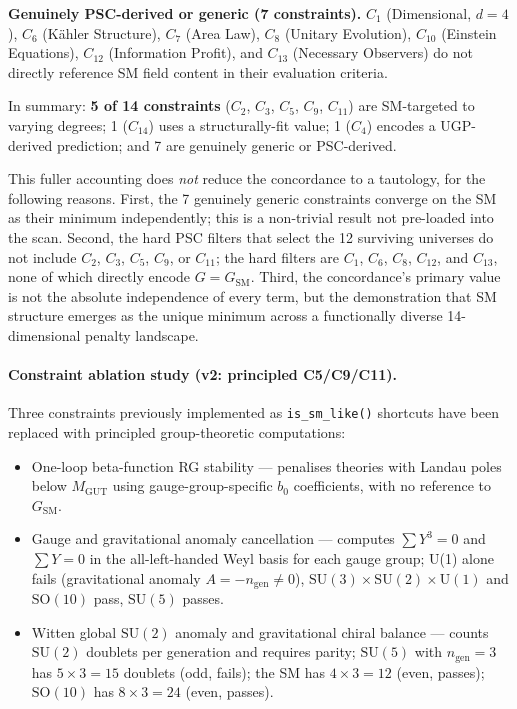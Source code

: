 \documentclass[11pt,twocolumn]{article}
\theoremstyle{remark}
\begin{document}
\textbf{Genuinely PSC-derived or generic (7 constraints).}
$C_1$ (Dimensional, $d=4$), $C_6$ (K\"{a}hler Structure), $C_7$ (Area
Law), $C_8$ (Unitary Evolution), $C_{10}$ (Einstein Equations), $C_{12}$
(Information Profit), and $C_{13}$ (Necessary Observers) do not
directly reference SM field content in their evaluation criteria.

In summary: \textbf{5 of 14 constraints} ($C_2$, $C_3$, $C_5$, $C_9$,
$C_{11}$) are SM-targeted to varying degrees; 1 ($C_{14}$) uses a
structurally-fit value; 1 ($C_4$) encodes a UGP-derived prediction; and
7 are genuinely generic or PSC-derived.

This fuller accounting does \emph{not} reduce the concordance to a
tautology, for the following reasons.
First, the 7 genuinely generic constraints converge on the SM as their
minimum independently; this is a non-trivial result not pre-loaded into
the scan.
Second, the hard PSC filters that select the 12 surviving universes
do not include $C_2$, $C_3$, $C_5$, $C_9$, or $C_{11}$; the
hard filters are $C_1$, $C_6$, $C_8$, $C_{12}$, and $C_{13}$,
none of which directly encode $G=G_{\mathrm{SM}}$.
Third, the concordance's primary value is not the absolute independence
of every term, but the demonstration that SM structure emerges as the
unique minimum across a functionally diverse 14-dimensional penalty
landscape.

\paragraph{Constraint ablation study (v2: principled C5/C9/C11).}
Three constraints previously implemented as \texttt{is\_sm\_like()} shortcuts
have been replaced with principled group-theoretic computations:
\begin{itemize}
  \item[$C_5$p:] One-loop beta-function RG stability — penalises theories with
    Landau poles below $M_{\mathrm{GUT}}$ using gauge-group-specific $b_0$ coefficients,
    with no reference to $G_{\mathrm{SM}}$.
  \item[$C_9$p:] Gauge and gravitational anomaly cancellation — computes
    $\sum Y^3 = 0$ and $\sum Y = 0$ in the all-left-handed Weyl basis for each
    gauge group; U(1) alone fails (gravitational anomaly $A = -n_{\mathrm{gen}}
    \neq 0$), $\mathrm{SU}(3)\times\mathrm{SU}(2)\times\mathrm{U}(1)$
    and $\mathrm{SO}(10)$ pass, $\mathrm{SU}(5)$ passes.
  \item[$C_{11}$p:] Witten global $\mathrm{SU}(2)$ anomaly and gravitational
    chiral balance — counts $\mathrm{SU}(2)$ doublets per generation
    and requires parity; $\mathrm{SU}(5)$ with $n_{\mathrm{gen}}=3$ has
    $5\times 3 = 15$ doublets (odd, fails); the SM has $4\times 3=12$ (even, passes);
    $\mathrm{SO}(10)$ has $8\times 3=24$ (even, passes).
\end{itemize}
\end{document}
